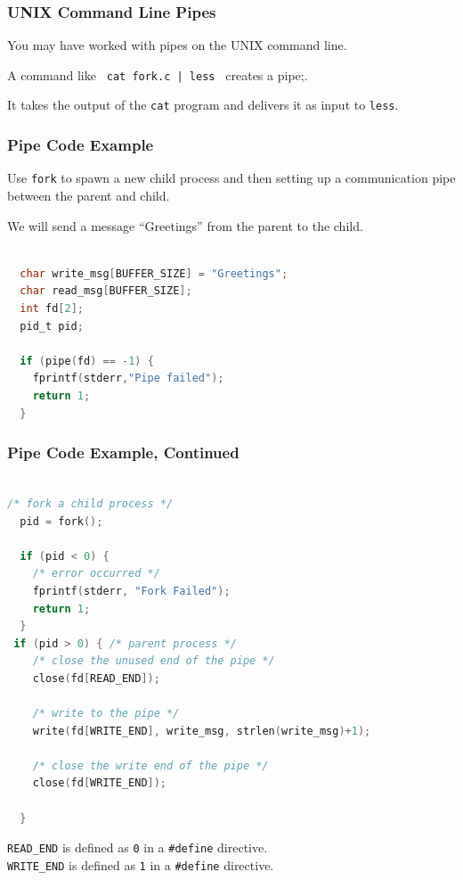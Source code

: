 \begin{frame}
	\frametitle{UNIX Command Line Pipes}

	You may have worked with pipes on the UNIX command line.

	A command like \texttt{ cat fork.c | less } creates a pipe;.

	It takes the output of the \texttt{cat} program and delivers it as input to \texttt{less}.

\end{frame}

\begin{frame}[fragile]
	\frametitle{Pipe Code Example}

	Use \texttt{fork} to spawn a new child process and then setting up a communication pipe between the parent and child.

	We will send a message ``Greetings'' from the parent to the child.

	\begin{lstlisting}[language=C]

  char write_msg[BUFFER_SIZE] = "Greetings"; 
  char read_msg[BUFFER_SIZE];
  int fd[2];
  pid_t pid;

  if (pipe(fd) == -1) {
    fprintf(stderr,"Pipe failed");
    return 1;
  }

\end{lstlisting}


\end{frame}

\begin{frame}[fragile]
	\frametitle{Pipe Code Example, Continued}

	\begin{lstlisting}[language=C]

/* fork a child process */
  pid = fork();
  
  if (pid < 0) { 
    /* error occurred */ 
    fprintf(stderr, "Fork Failed"); 
    return 1;
  }
 if (pid > 0) { /* parent process */
    /* close the unused end of the pipe */ 
    close(fd[READ_END]);
    
    /* write to the pipe */
    write(fd[WRITE_END], write_msg, strlen(write_msg)+1);
    
    /* close the write end of the pipe */
    close(fd[WRITE_END]);
    
  } 

\end{lstlisting}

	\texttt{READ\_END} is defined as \texttt{0} in a \texttt{\#define} directive.\\
	\texttt{WRITE\_END} is defined as \texttt{1} in a \texttt{\#define} directive.

\end{frame}


